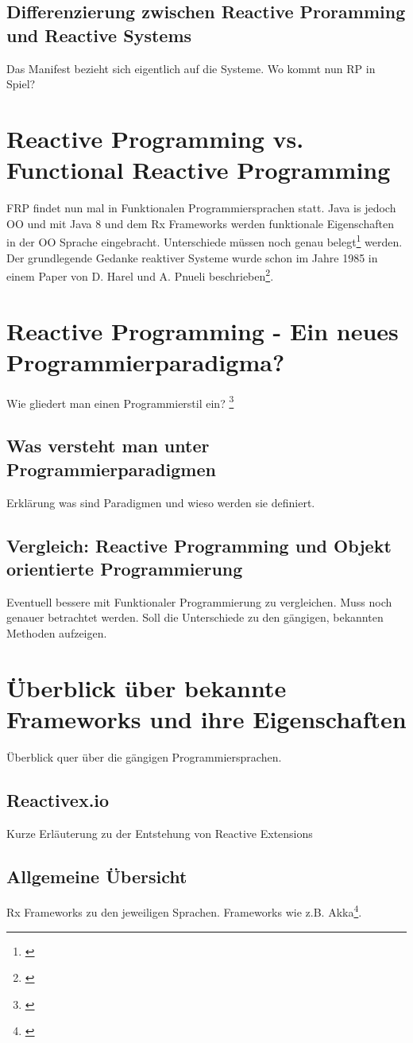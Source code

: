 \subsection{Differenzierung zwischen Reactive Proramming und Reactive Systems}
Das Manifest bezieht sich eigentlich auf die Systeme. Wo kommt nun RP in Spiel? 
\section{Reactive Programming vs. Functional Reactive Programming}
FRP findet nun mal in Funktionalen Programmiersprachen statt. Java is jedoch OO und mit Java 8 und dem Rx Frameworks werden funktionale Eigenschaften in der OO Sprache eingebracht. Unterschiede müssen noch genau belegt\footnote{\cite{Lohmuller.2016}} werden.
Der grundlegende Gedanke reaktiver Systeme wurde schon im Jahre 1985 in einem Paper von D. Harel und A. Pnueli beschrieben\footnote{\cite{Harel1985}}. 
\section{Reactive Programming - Ein neues Programmierparadigma?}
Wie gliedert man einen Programmierstil ein? \footnote{\cite{Bainomugisha.2013}}
\subsection{Was versteht man unter Programmierparadigmen}
 Erklärung was sind Paradigmen und wieso werden sie definiert.
\subsection{Vergleich: Reactive Programming und Objekt orientierte Programmierung}
Eventuell bessere mit Funktionaler Programmierung zu vergleichen. Muss noch genauer betrachtet werden. Soll die Unterschiede zu den gängigen, bekannten Methoden aufzeigen.
\section{Überblick über bekannte Frameworks und ihre Eigenschaften}
Überblick quer über die gängigen Programmiersprachen. 
\subsection{Reactivex.io}
Kurze Erläuterung zu der Entstehung von Reactive Extensions
\subsection{Allgemeine Übersicht}
Rx Frameworks zu den jeweiligen Sprachen. Frameworks wie z.B. Akka\footnote{\cite{Karnok.2016}}. 
